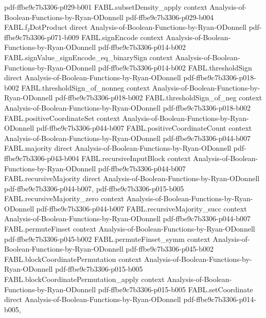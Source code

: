 \begin{theorem}
{    pdf-ffbe9c7b3306-p029-b001}
\proofstep
  {FABL.subsetDensity_apply}
  {context}
  {Analysis-of-Boolean-Functions-by-Ryan-ODonnell}
  {pdf-ffbe9c7b3306-p029-b004}
\proofstep
  {FABL.f₂DotProduct}
  {direct}
  {Analysis-of-Boolean-Functions-by-Ryan-ODonnell}
  {pdf-ffbe9c7b3306-p071-b009}
\proofstep
  {FABL.signEncode}
  {context}
  {Analysis-of-Boolean-Functions-by-Ryan-ODonnell}
  {pdf-ffbe9c7b3306-p014-b002}
\proofstep
  {FABL.signValue_signEncode_eq_binarySign}
  {context}
  {Analysis-of-Boolean-Functions-by-Ryan-ODonnell}
  {pdf-ffbe9c7b3306-p014-b002}
\proofstep
  {FABL.thresholdSign}
  {direct}
  {Analysis-of-Boolean-Functions-by-Ryan-ODonnell}
  {pdf-ffbe9c7b3306-p018-b002}
\proofstep
  {FABL.thresholdSign_of_nonneg}
  {context}
  {Analysis-of-Boolean-Functions-by-Ryan-ODonnell}
  {pdf-ffbe9c7b3306-p018-b002}
\proofstep
  {FABL.thresholdSign_of_neg}
  {context}
  {Analysis-of-Boolean-Functions-by-Ryan-ODonnell}
  {pdf-ffbe9c7b3306-p018-b002}
\proofstep
  {FABL.positiveCoordinateSet}
  {context}
  {Analysis-of-Boolean-Functions-by-Ryan-ODonnell}
  {pdf-ffbe9c7b3306-p044-b007}
\proofstep
  {FABL.positiveCoordinateCount}
  {context}
  {Analysis-of-Boolean-Functions-by-Ryan-ODonnell}
  {pdf-ffbe9c7b3306-p044-b007}
\proofstep
  {FABL.majority}
  {direct}
  {Analysis-of-Boolean-Functions-by-Ryan-ODonnell}
  {pdf-ffbe9c7b3306-p043-b004}
\proofstep
  {FABL.recursiveInputBlock}
  {context}
  {Analysis-of-Boolean-Functions-by-Ryan-ODonnell}
  {pdf-ffbe9c7b3306-p044-b007}
\proofstep
  {FABL.recursiveMajority}
  {direct}
  {Analysis-of-Boolean-Functions-by-Ryan-ODonnell}
  {pdf-ffbe9c7b3306-p044-b007,
    pdf-ffbe9c7b3306-p015-b005}
\proofstep
  {FABL.recursiveMajority_zero}
  {context}
  {Analysis-of-Boolean-Functions-by-Ryan-ODonnell}
  {pdf-ffbe9c7b3306-p044-b007}
\proofstep
  {FABL.recursiveMajority_succ}
  {context}
  {Analysis-of-Boolean-Functions-by-Ryan-ODonnell}
  {pdf-ffbe9c7b3306-p044-b007}
\proofstep
  {FABL.permuteFinset}
  {context}
  {Analysis-of-Boolean-Functions-by-Ryan-ODonnell}
  {pdf-ffbe9c7b3306-p045-b002}
\proofstep
  {FABL.permuteFinset_symm}
  {context}
  {Analysis-of-Boolean-Functions-by-Ryan-ODonnell}
  {pdf-ffbe9c7b3306-p045-b002}
\proofstep
  {FABL.blockCoordinatePermutation}
  {context}
  {Analysis-of-Boolean-Functions-by-Ryan-ODonnell}
  {pdf-ffbe9c7b3306-p015-b005}
\proofstep
  {FABL.blockCoordinatePermutation_apply}
  {context}
  {Analysis-of-Boolean-Functions-by-Ryan-ODonnell}
  {pdf-ffbe9c7b3306-p015-b005}
\proofstep
  {FABL.setCoordinate}
  {direct}
  {Analysis-of-Boolean-Functions-by-Ryan-ODonnell}
  {pdf-ffbe9c7b3306-p014-b005,
}
\end{theorem}
